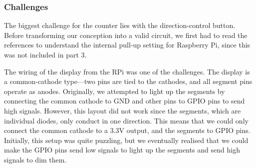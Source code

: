 \documentclass[9pt,a4paper]{article}
\begin{document}
\begin{minipage}[t]{0.6\textwidth}
\centering
{}
\end{minipage}

\subsubsection{Challenges}

The biggest challenge for the counter lies with the direction-control button.
Before transforming our conception into a valid circuit, we first had to read the references to understand the internal pull-up setting for Raspberry Pi, since this was not included in part 3.

The wiring of the display from the RPi was one of the challenges. The display is a common-cathode type—two pins are tied to the cathodes, and all segment pins operate as anodes.
Originally, we attempted to light up the segments by connecting the common cathode to GND and other pins to GPIO pins to send high signals.
However, this layout did not work since the segments, which are individual diodes, only conduct in one direction.
This means that we could only connect the common cathode to a 3.3V output, and the segments to GPIO pins.
Initially, this setup was quite puzzling, but we eventually realised that we could make the GPIO pins send low signals to light up the segments and send high signals to dim them.
\end{document}
